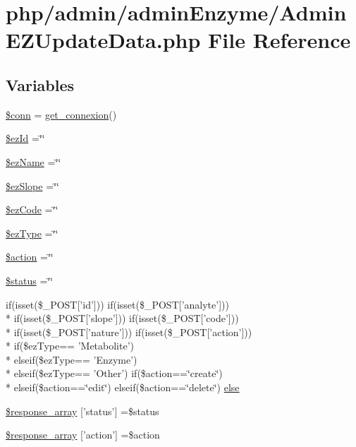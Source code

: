 \hypertarget{_admin_e_z_update_data_8php}{\section{php/admin/admin\-Enzyme/\-Admin\-E\-Z\-Update\-Data.php File Reference}
\label{_admin_e_z_update_data_8php}
}
\subsection*{Variables}
\begin{DoxyCompactItemize}
\item 
\hyperlink{_admin_e_z_update_data_8php_aa8a5a87b9c1a6a0819b88447cbe41877}{\$conn} = \hyperlink{php__functions_8php_ace18bc10f3fd08f92688ac743e0d8c2e}{get\-\_\-connexion}()
\item 
\hyperlink{_admin_e_z_update_data_8php_ae9a60f2c381103ddf1a3fda7be76d890}{\$ez\-Id} =\char`\"{}\char`\"{}
\item 
\hyperlink{_admin_e_z_update_data_8php_a57a9615262224b8dda435a084ba02406}{\$ez\-Name} =\char`\"{}\char`\"{}
\item 
\hyperlink{_admin_e_z_update_data_8php_a1efbb279669bdab5d5eaff4f289c71a2}{\$ez\-Slope} =\char`\"{}\char`\"{}
\item 
\hyperlink{_admin_e_z_update_data_8php_a1a28f4870dd5aff7acdc3184a85a30c7}{\$ez\-Code} =\char`\"{}\char`\"{}
\item 
\hyperlink{_admin_e_z_update_data_8php_aee528badcb788c913ffab530a5b876cf}{\$ez\-Type} =\char`\"{}\char`\"{}
\item 
\hyperlink{_admin_e_z_update_data_8php_aa698a3e72116e8e778be0e95d908ee30}{\$action} =\char`\"{}\char`\"{}
\item 
\hyperlink{_admin_e_z_update_data_8php_a58391ea75f2d29d5d708d7050b641c33}{\$status} =\char`\"{}\char`\"{}
\item 
if(isset(\$\-\_\-\-P\-O\-S\-T\mbox{[}'id'\mbox{]})) if(isset(\$\-\_\-\-P\-O\-S\-T\mbox{[}'analyte'\mbox{]})) \\*
if(isset(\$\-\_\-\-P\-O\-S\-T\mbox{[}'slope'\mbox{]})) if(isset(\$\-\_\-\-P\-O\-S\-T\mbox{[}'code'\mbox{]})) \\*
if(isset(\$\-\_\-\-P\-O\-S\-T\mbox{[}'nature'\mbox{]})) if(isset(\$\-\_\-\-P\-O\-S\-T\mbox{[}'action'\mbox{]})) \\*
if(\$ez\-Type== 'Metabolite') \\*
elseif(\$ez\-Type== 'Enzyme') \\*
elseif(\$ez\-Type== 'Other') if(\$action==\char`\"{}create\char`\"{}) \\*
elseif(\$action==\char`\"{}edit\char`\"{}) elseif(\$action==\char`\"{}delete\char`\"{}) \hyperlink{_admin_e_z_update_data_8php_ab64b785fa9f787cb880a97455db04dea}{else}
\item 
\hyperlink{_admin_e_z_update_data_8php_acd0903a7a32e8397aefd0ce8b7dbd1ab}{\$response\-\_\-array} \mbox{[}'status'\mbox{]} =\$status
\item 
\hyperlink{_admin_e_z_update_data_8php_ae768978a0cdc416c0d63d798c85c8784}{\$response\-\_\-array} \mbox{[}'action'\mbox{]} =\$action
\end{DoxyCompactItemize}


